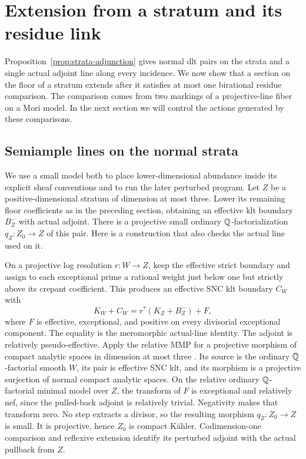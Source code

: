 \section{Extension from a stratum and its residue link}\label{sec:links}

Proposition~\ref{prop:strata-adjunction} gives normal dlt pairs on the
strata and a single actual adjoint line along every incidence.  We now
show that a section on the floor of a stratum extends after it satisfies
at most one birational residue comparison.  The comparison comes from
two markings of a projective-line fiber on a Mori model.  In the next
section we will control the actions generated by these comparisons.

\subsection{Semiample lines on the normal strata}

We use a small model both to place lower-dimensional abundance inside its
explicit sheaf conventions and to run the later perturbed program.  Let
\(Z\) be a positive-dimensional stratum of dimension at most three.
Lower its remaining floor coefficients as in the preceding section,
obtaining an effective klt boundary \(B_Z^-\) with actual adjoint.
There is a projective small ordinary \(\mathbb Q\)-factorialization
\(q_Z:Z_0\to Z\) of this pair.  Here is a construction that also checks
the actual line used on it.

On a projective log resolution \(r:W\to Z\), keep the effective strict
boundary and assign to each exceptional prime a rational weight just below
one but strictly above its crepant coefficient.  This produces an
effective SNC klt boundary \(C_W\) with
\[
 K_W+C_W=r^*(K_Z+B_Z^-)+F,
\]
where \(F\) is effective, exceptional, and positive on every divisorial
exceptional component.  The equality is the meromorphic actual-line
identity.  The adjoint is relatively pseudo-effective.  Apply the
relative MMP for a projective morphism of compact analytic spaces in
dimension at most three \cite[Proposition~2.26]{DasHacon2024}.  Its source
is the ordinary \(\mathbb Q\)-factorial smooth \(W\), its pair is effective SNC
klt, and its morphism is a projective surjection of normal compact
analytic spaces.  On the
relative ordinary \(\mathbb Q\)-factorial minimal model over \(Z\), the transform
of \(F\) is exceptional and relatively nef, since the pulled-back adjoint
is relatively trivial.  Negativity makes that transform zero.  No step
extracts a divisor, so the resulting morphism \(q_Z:Z_0\to Z\) is small.
It is projective, hence \(Z_0\) is compact K\"ahler.  Codimension-one
comparison and reflexive extension identify its perturbed adjoint with
the actual pullback from \(Z\).


